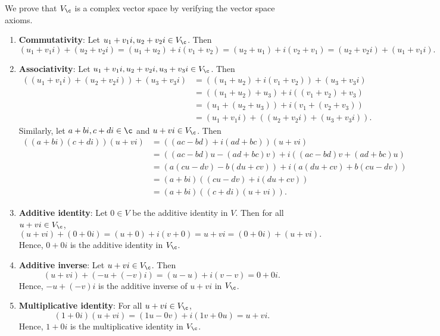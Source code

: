\begin{sol}
    We prove that $V_{\c}$ is a complex vector space by verifying the vector space axioms.
    \begin{enumerate}
        \item \textbf{Commutativity}: Let $u_1 + v_1i, u_2 + v_2i \in V_{\c}$. Then
        \[(u_1 + v_1i) + (u_2 + v_2i) = (u_1 + u_2) + i(v_1 + v_2) = (u_2 + u_1) + i(v_2 + v_1) = (u_2 + v_2i) + (u_1 + v_1i).\]
        \item \textbf{Associativity}: Let $u_1 + v_1i, u_2 + v_2i, u_3 + v_3i \in V_{\c}$. Then
        \begin{align*}
            ((u_1 + v_1i) + (u_2 + v_2i)) + (u_3 + v_3i) & = ((u_1 + u_2) + i(v_1 + v_2)) + (u_3 + v_3i) \\
            & = ((u_1 + u_2) + u_3) + i((v_1 + v_2) + v_3) \\
            & = (u_1 + (u_2 + u_3)) + i(v_1 + (v_2 + v_3)) \\
            & = (u_1 + v_1i) + ((u_2 + v_2i) + (u_3 + v_3i)).
        \end{align*}
        Similarly, let $a + bi, c + di \in \c$ and $u + vi \in V_{\c}$. Then
        \begin{align*}
            ((a + bi)(c + di))(u + vi) & = ((ac - bd) + i(ad + bc))(u + vi) \\
            & = ((ac - bd)u - (ad + bc)v) + i((ac - bd)v + (ad + bc)u) \\
            & = (a(cu - dv) - b(du + cv)) + i(a(du + cv) + b(cu - dv)) \\
            & = (a + bi)((cu - dv) + i(du + cv)) \\
            & = (a + bi)((c + di)(u + vi)).
        \end{align*}
        \item \textbf{Additive identity}: Let $0 \in V$ be the additive identity in $V$. Then for all $u + vi \in V_{\c}$,
        \[(u + vi) + (0 + 0i) = (u + 0) + i(v + 0) = u + vi = (0 + 0i) + (u + vi).\]
        Hence, $0 + 0i$ is the additive identity in $V_{\c}$.
        \item \textbf{Additive inverse}: Let $u + vi \in V_{\c}$. Then
        \[(u + vi) + (-u + (-v)i) = (u - u) + i(v - v) = 0 + 0i.\]
        Hence, $-u + (-v)i$ is the additive inverse of $u + vi$ in $V_{\c}$.
        \item \textbf{Multiplicative identity}: For all $u + vi \in V_{\c}$,
        \[(1 + 0i)(u + vi) = (1u - 0v) + i(1v + 0u) = u + vi.\]
        Hence, $1 + 0i$ is the multiplicative identity in $V_{\c}$.

\end{enumerate}
\end{sol}
